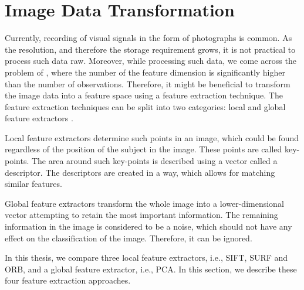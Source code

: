 \chapter{Image Data Transformation}

Currently, recording of visual signals in the form of photographs is common. As the resolution, and therefore the storage requirement grows, it is not practical to process such data raw. Moreover, while processing such data, we come across the problem of , where the number of the feature dimension is significantly higher than the number of observations. Therefore, it might be beneficial to transform the image data into a feature space using a feature extraction technique. The feature extraction techniques can be split into two categories: local and global feature extractors \cite{lee2005}.

Local feature extractors determine such points in an image, which could be found regardless of the position of the subject in the image. These points are called key-points. The area around such key-points is described using a vector called a descriptor. The descriptors are created in a way, which allows for matching similar features.

Global feature extractors transform the whole image into a lower-dimensional vector attempting to retain the most important information. The remaining information in the image is considered to be a noise, which should not have any effect on the classification of the image. Therefore, it can be ignored.

In this thesis, we compare three local feature extractors, i.e., SIFT, SURF and ORB, and a global feature extractor, i.e., PCA. In this section, we describe these four feature extraction approaches.











